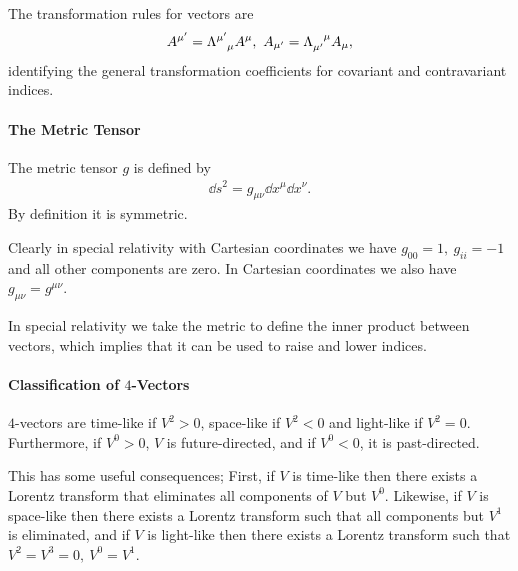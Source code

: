 The transformation rules for vectors are
\begin{align*}
	A^{\mu\p} = \trcou{\mu\p}{\mu}A^{\mu},\ A_{\mu\p} = \trcod{\mu\p}{\mu}A_{\mu},
\end{align*}
identifying the general transformation coefficients for covariant and contravariant indices.

\paragraph{The Metric Tensor}
The metric tensor $g$ is defined by
\begin{align*}
	\dd{s}^{2} = g_{\mu\nu}\dd{x^{\mu}}\dd{x^{\nu}}.
\end{align*}
By definition it is symmetric.

Clearly in special relativity with Cartesian coordinates we have $g_{00} = 1,\ g_{ii} = -1$ and all other components are zero. In Cartesian coordinates we also have $g_{\mu\nu} = g^{\mu\nu}$.

In special relativity we take the metric to define the inner product between vectors, which implies that it can be used to raise and lower indices.

\paragraph{Classification of $4$-Vectors}
$4$-vectors are time-like if $V^{2} > 0$, space-like if $V^{2} < 0$ and light-like if $V^{2} = 0$. Furthermore, if $V^{0} > 0$, $V$ is future-directed, and if $V^{0} < 0$, it is past-directed.

This has some useful consequences; First, if $V$ is time-like then there exists a Lorentz transform that eliminates all components of $V$ but $V^{0}$. Likewise, if $V$ is space-like then there exists a Lorentz transform such that all components but $V^{1}$ is eliminated, and if $V$ is light-like then there exists a Lorentz transform such that $V^{2} = V^{3} = 0,\ V^{0} = V^{1}$.


